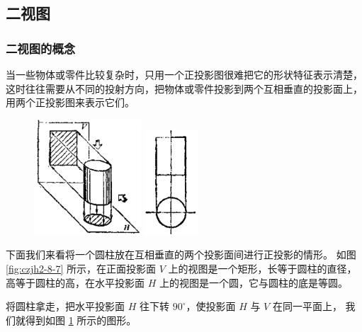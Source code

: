 \subsection{二视图}\label{subsec:czjh2-8-2}

\subsubsection{二视图的概念}

当一些物体或零件比较复杂时，只用一个正投影图很难把它的形状特征表示清楚，
这时往往需要从不同的投射方向，把物体或零件投影到两个互相垂直的投影面上，用两个正投影图来表示它们。
\begin{figure}[htbp]
    \centering
    \begin{minipage}[b]{7cm}
        \centering
        \includegraphics[width=4cm]{../pic/czjh2-ch8-07.png}
        \caption{}\label{fig:czjh2-8-7}
    \end{minipage}
    \begin{minipage}[b]{7cm}
        \centering
        \includegraphics[width=2cm]{../pic/czjh2-ch8-08.png}
        \caption{}\label{fig:czjh2-8-8}
    \end{minipage}
\end{figure}
下面我们来看将一个圆柱放在互相垂直的两个投影面间进行正投影的情形。
如图 \ref{fig:czjh2-8-7} 所示，在正面投影面 $V$ 上的视图是一个矩形，长等于圆柱的直径，
高等于圆柱的高，在水平投影面 $H$ 上的视图是一个圆，它与圆柱的底是等圆。



将圆柱拿走，把水平投影面 $H$ 往下转 $90^\circ$，使投影面 $H$ 与 $V$ 在同一平面上，
我们就得到如图 \ref{fig:czjh2-8-8} 所示的图形。

